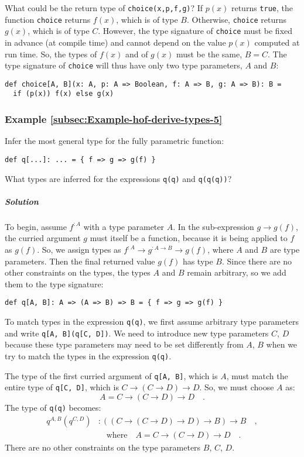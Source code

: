 What could be the return type of \lstinline!choice(x,p,f,g)!? If
$p(x)$ returns \lstinline!true!, the function \lstinline!choice!
returns $f(x)$, which is of type $B$. Otherwise, \lstinline!choice!
returns $g(x)$, which is of type $C$. However, the type signature
of \lstinline!choice! must be fixed in advance (at compile time)
and cannot depend on the value $p(x)$ computed at run time. So, the
types of $f(x)$ and of $g(x)$ must be the same, $B=C$. The type
signature of \lstinline!choice! will thus have only two type parameters,
$A$ and $B$:
\begin{lstlisting}
def choice[A, B](x: A, p: A => Boolean, f: A => B, g: A => B): B =
  if (p(x)) f(x) else g(x)
\end{lstlisting}


\subsubsection{Example \label{subsec:Example-hof-derive-types-5}\ref{subsec:Example-hof-derive-types-5}}

Infer the most general type for the fully parametric function:
\begin{lstlisting}
def q[...]: ... = { f => g => g(f) }
\end{lstlisting}
What types are inferred for the expressions \lstinline!q(q)! and
\lstinline!q(q(q))!?

\subparagraph{Solution}

To begin, assume $f^{:A}$ with a type parameter $A$. In the sub-expression
$g\rightarrow g(f)$, the curried argument $g$ must itself be a function,
because it is being applied to $f$ as $g(f)$. So, we assign types
as $f^{:A}\rightarrow g^{:A\rightarrow B}\rightarrow g(f)$, where
$A$ and $B$ are type parameters. Then the final returned value $g(f)$
has type $B$. Since there are no other constraints on the types,
the types $A$ and $B$ remain arbitrary, so we add them to the type
signature:
\begin{lstlisting}
def q[A, B]: A => (A => B) => B = { f => g => g(f) }
\end{lstlisting}

To match types in the expression \lstinline!q(q)!, we first assume
arbitrary type parameters and write \lstinline!q[A, B](q[C, D])!.
We need to introduce new type parameters $C$, $D$ because these
type parameters may need to be set differently from $A$, $B$ when
we try to match the types in the expression \lstinline!q(q)!.

The type of the first curried argument of \lstinline!q[A, B]!, which
is $A$, must match the entire type of \lstinline!q[C, D]!, which
is $C\rightarrow\left(C\rightarrow D\right)\rightarrow D$. So, we
must choose $A$ as:
\[
A=C\rightarrow\left(C\rightarrow D\right)\rightarrow D\quad.
\]
The type of \lstinline!q(q)! becomes:
\begin{align*}
q^{A,B}(q^{C,D}) & :\left(\left(C\rightarrow\left(C\rightarrow D\right)\rightarrow D\right)\rightarrow B\right)\rightarrow B\quad,\\
 & \quad\text{where}\quad A=C\rightarrow\left(C\rightarrow D\right)\rightarrow D\quad.
\end{align*}
There are no other constraints on the type parameters $B$, $C$,
$D$.

